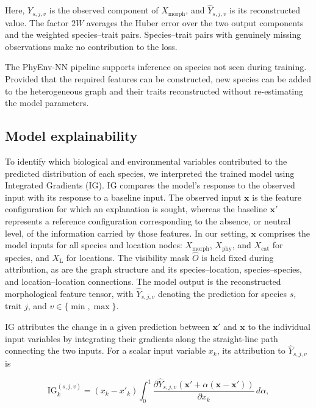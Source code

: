 \documentclass[preprint,12pt,authoryear]{elsarticle}
\newcommand{\awesomeModel}{PhyEnv-NN }
\begin{document}
Here, $Y_{s,j,v}$ is the observed component of $X_{\mathrm{morph}}$, and $\hat{Y}_{s,j,v}$ is its reconstructed value. The factor $2W$ averages the Huber error over the two output components and the weighted species--trait pairs. Species--trait pairs with genuinely missing observations make no contribution to the loss.

The \awesomeModel pipeline supports inference on species not seen during training. Provided that the required features can be constructed, new species can be added to the heterogeneous graph and their traits reconstructed without re-estimating the model parameters.


\subsection{Model explainability}


To identify which biological and environmental variables contributed to the predicted distribution of each species, we interpreted the trained model using Integrated Gradients (IG). 
IG compares the model's response to the observed input with its response to a baseline input. The observed input $\mathbf{x}$ is the feature configuration for which an explanation is sought, whereas the baseline $\mathbf{x}'$ represents a reference configuration corresponding to the absence, or neutral level, of the information carried by those features. 
In our setting, $\mathbf{x}$ comprises the model inputs for all species and location nodes: $X_{\mathrm{morph}}$, $X_{\mathrm{phy}}$, and $X_{\mathrm{cat}}$ for species, and $X_{\mathrm{L}}$ for locations. The visibility mask $\hat O$ is held fixed during attribution, as are the graph structure and its species--location, species--species, and location--location connections. The model output is the reconstructed morphological feature tensor, with $\hat{Y}_{s,j,v}$ denoting the prediction for species $s$, trait $j$, and $v\in\{\min,\max\}$.

IG attributes the change in a given prediction between \(\mathbf{x}'\) and \(\mathbf{x}\) to the individual input variables by integrating their gradients along the straight-line path connecting the two inputs. For a scalar input variable \(x_k\), its attribution to \(\hat{Y}_{s,j,v}\) is

\begin{equation}
    \mathrm{IG}^{(s,j,v)}_k
    =
    (x_k-x'_k)
    \int_0^1
    \frac{\partial \hat Y_{s,j,v}
    \left(
    \mathbf{x}'+
    \alpha(\mathbf{x}-\mathbf{x}')
    \right)}
    {\partial x_k}
    \,d\alpha ,
\end{equation}
\end{document}
